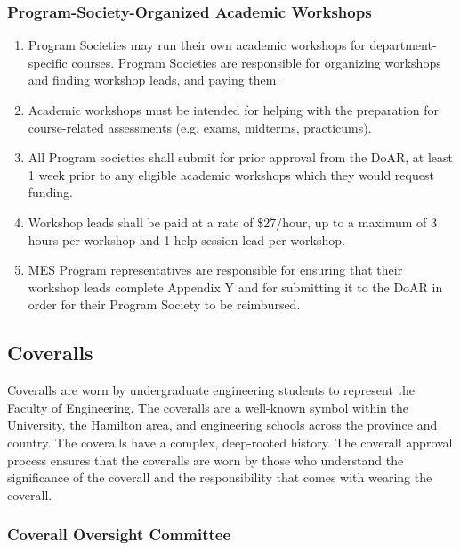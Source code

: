 \subsubsection{Program-Society-Organized Academic
 Workshops}
\label{program-society-organized-academic-workshops}
\begin{enumerate}
 \item
  Program Societies may run their own academic workshops for department-specific courses. Program Societies are responsible for organizing workshops and finding workshop leads, and paying them.
 \item
  Academic workshops must be intended for helping with the preparation for course-related assessments (e.g. exams, midterms, practicums). 
 \item 
  All Program societies shall submit for prior approval from the DoAR, at least 1 week prior to any eligible academic workshops which they would request funding.
 \item
  Workshop leads shall be paid at a rate of \$27/hour, up to a maximum of 3 hours per workshop and 1 help session lead per workshop.
 \item
  MES Program representatives are responsible for ensuring that their workshop leads complete Appendix Y and for submitting it to the DoAR in order for their Program Society to be reimbursed.
\end{enumerate}

\subsection{Coveralls}
\label{coveralls}
Coveralls are worn by undergraduate engineering students to represent
the Faculty of Engineering. The coveralls are a well-known symbol within
the University, the Hamilton area, and engineering schools across the
province and country. The coveralls have a complex, deep-rooted history.
The coverall approval process ensures that the coveralls are worn by
those who understand the significance of the coverall and the
responsibility that comes with wearing the coverall.

\subsubsection{Coverall Oversight Committee}
\label{coverall-oversight-committee}


